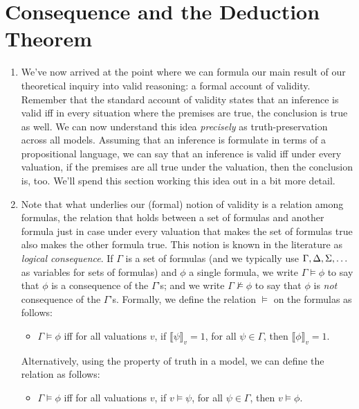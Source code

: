 \section{Consequence and the Deduction Theorem}	

	\begin{enumerate}[\thesection.1]

		\item We've now arrived at the point where we can formula our main result of our theoretical inquiry into valid reasoning: a formal account of validity. Remember that the standard account of validity states that an inference is valid iff in every situation where the premises are true, the conclusion is true as well. We can now understand this idea \emph{precisely} as truth-preservation across all models. Assuming that an inference is formulate in terms of a propositional language, we can say that an inference is valid iff under every valuation, if the premises are all true under the valuation, then the conclusion is, too. We'll spend this section working this idea out in a bit more detail.
		
		\item Note that what underlies our (formal) notion of validity is a relation among formulas, the relation that holds between a set of formulas and another formula just in case under every valuation that makes the set of formulas true also makes the other formula true. This notion is known in the literature as \emph{logical consequence}. If $\Gamma$ is a set of formulas (and we typically use $\Gamma,\Delta,\Sigma, \mathellipsis$ as variables for sets of formulas) and $\phi$ a single formula, we write $\Gamma\vDash \phi$ to say that $\phi$ is a consequence of the $\Gamma$'s; and we write $\Gamma\nvDash \phi$ to say that $\phi$ is \emph{not} consequence of the $\Gamma$'s. Formally, we define the relation $\vDash$ on the formulas as follows:		
		\begin{itemize}
		
			\item $\Gamma\vDash\phi$ iff for all valuations $v$, if $\llbracket\psi\rrbracket_v=1$, for all $\psi\in\Gamma$, then $\llbracket\phi\rrbracket_v=1$.
		
		\end{itemize}
Alternatively, using the property of truth in a model, we can define the relation as follows:
		\begin{itemize}
		
			\item $\Gamma\vDash\phi$ iff for all valuations $v$, if $v\vDash\psi$, for all $\psi\in\Gamma$, then $v\vDash\phi$.
		

\end{itemize}
\end{enumerate}
